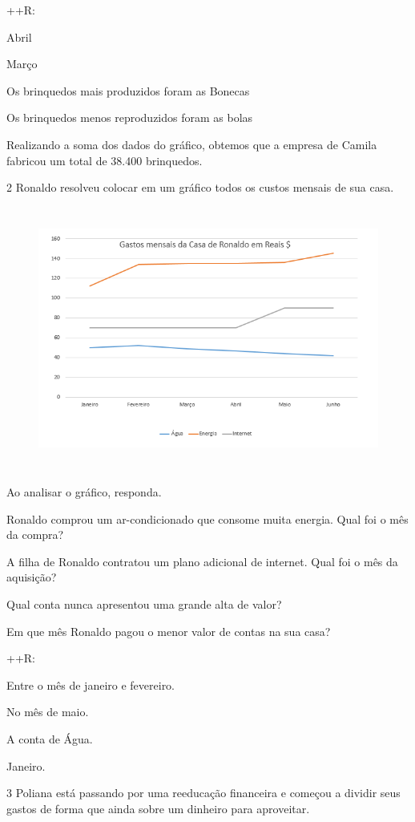 ++R:
\item Abril
\item Março
\item Os brinquedos mais produzidos foram as Bonecas
\item Os brinquedos menos reproduzidos foram as bolas
\item Realizando a soma dos dados do gráfico, obtemos que a empresa de
Camila fabricou um total de 38.400 brinquedos.

\num{2} Ronaldo resolveu colocar em um gráfico todos os custos mensais de sua
casa.

\begin{figure}[H]
\centering\includegraphics[width=5.30833in,height=3.41384in]{./imgSAEB_8_MAT/media/image40.png}
\end{figure}

Ao analisar o gráfico, responda.
\item Ronaldo comprou um ar-condicionado que consome muita energia. Qual
foi o mês da compra?
\item A filha de Ronaldo contratou um plano adicional de internet. Qual foi
o mês da aquisição?
\item Qual conta nunca apresentou uma grande alta de valor?
\item Em que mês Ronaldo pagou o menor valor de contas na sua casa?

++R:
\item Entre o mês de janeiro e fevereiro.
\item No mês de maio.
\item A conta de Água.
\item Janeiro.

\num{3} Poliana está passando por uma reeducação financeira e começou a
dividir seus gastos de forma que ainda sobre um dinheiro para
aproveitar.

